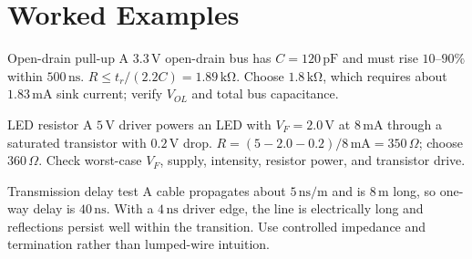 \documentclass[10pt,letterpaper]{article}
\begin{document}
\section{Worked Examples}
\begin{CornellExamBox}{Open-drain pull-up}
A $3.3\,\mathrm{V}$ open-drain bus has $C=120\,\mathrm{pF}$ and must rise $10$--$90\%$ within $500\,\mathrm{ns}$. $R\le t_r/(2.2C)=1.89\,\mathrm{k\Omega}$. Choose $1.8\,\mathrm{k\Omega}$, which requires about $1.83\,\mathrm{mA}$ sink current; verify $V_{OL}$ and total bus capacitance.
\end{CornellExamBox}
\begin{CornellExamBox}{LED resistor}
A $5\,\mathrm{V}$ driver powers an LED with $V_F=2.0\,\mathrm{V}$ at $8\,\mathrm{mA}$ through a saturated transistor with $0.2\,\mathrm{V}$ drop. $R=(5-2.0-0.2)/8\,\mathrm{mA}=350\,\Omega$; choose $360\,\Omega$. Check worst-case $V_F$, supply, intensity, resistor power, and transistor drive.
\end{CornellExamBox}
\begin{CornellExamBox}{Transmission delay test}
A cable propagates about $5\,\mathrm{ns/m}$ and is $8\,\mathrm{m}$ long, so one-way delay is $40\,\mathrm{ns}$. With a $4\,\mathrm{ns}$ driver edge, the line is electrically long and reflections persist well within the transition. Use controlled impedance and termination rather than lumped-wire intuition.
\end{CornellExamBox}
\end{document}
